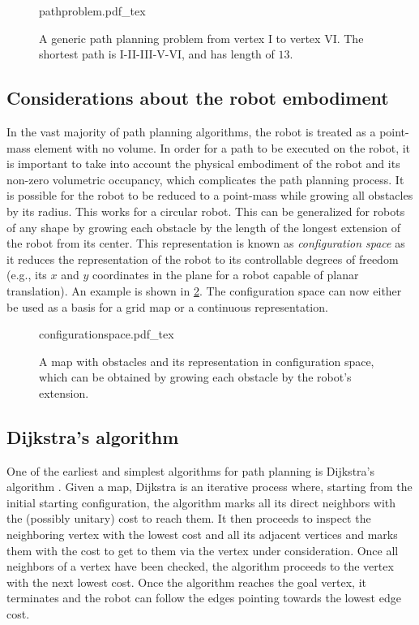 \begin{figure}
    \centering
    \def\svgwidth{0.6\textwidth}
    {pathproblem.pdf_tex}
    \caption{A generic path planning problem from vertex I to vertex VI. The shortest path is I-II-III-V-VI, and has length of $13$. \label{fig:pathproblem}}
\end{figure}

\subsection{Considerations about the robot embodiment}

In the vast majority of path planning algorithms, the robot is treated as a point-mass element with no volume. In order for a path to be executed on the robot, it is important to take into account the physical embodiment of the robot and its non-zero volumetric occupancy, which complicates the path planning process.
It is possible for the robot to be reduced to a point-mass while growing all obstacles by its radius. This works for a circular robot. This can be generalized for robots of any shape by growing each obstacle by the length of the longest extension of the robot from its center. This representation is known as \textsl{configuration space} as it reduces the representation of the robot to its controllable degrees of freedom (e.g., its $x$ and $y$ coordinates in the plane for a robot capable of planar translation). An example is shown in \cref{fig:cspace}. The configuration space can now either be used as a basis for a grid map or a continuous representation.

\begin{figure}
    \centering
    \def\svgwidth{0.9\textwidth}
    {configurationspace.pdf_tex}
    \caption{A map with obstacles and its representation in configuration space, which can be obtained by growing each obstacle by the robot's extension. \label{fig:cspace}}
\end{figure}

\subsection{Dijkstra's algorithm}

One of the earliest and simplest algorithms for path planning is Dijkstra's algorithm \cite{dijkstra1959note}. Given a map, Dijkstra is an iterative process where, starting from the initial starting configuration, the algorithm marks all its direct neighbors with the (possibly unitary) cost to reach them. It then proceeds to inspect the neighboring vertex with the lowest cost and all its adjacent vertices and marks them with the cost to get to them via the vertex under consideration. Once all neighbors of a vertex have been checked, the algorithm proceeds to the vertex with the next lowest cost. Once the algorithm reaches the goal vertex, it terminates and the robot can follow the edges pointing towards the lowest edge cost.

